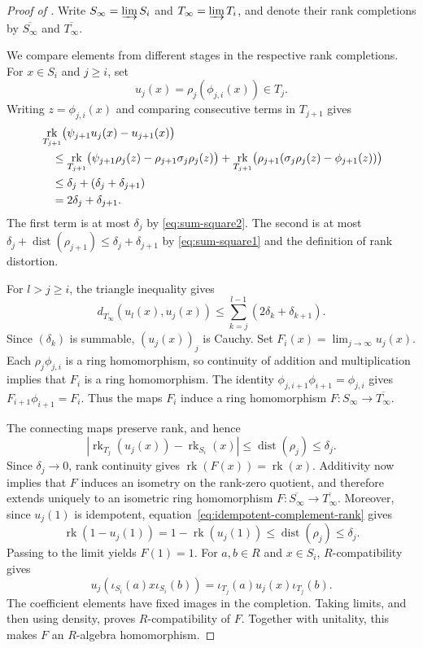 \documentclass[11pt]{amsart}
\DeclareMathOperator{\rk}{rk}
\theoremstyle{definition}
\theoremstyle{remark}
\begin{document}
\begin{proof}[Proof of ]
Write $S_\infty=\varinjlim S_i$ and $T_\infty=\varinjlim T_i$, and denote
their rank completions by $\overline{S_\infty}$ and $\overline{T_\infty}$.

We compare elements from different stages in the respective rank completions.
For $x\in S_i$ and $j\geq i$, set
\[
  u_j(x)=\rho_j(\phi_{j,i}(x))\in T_j.
\]
Writing $z=\phi_{j,i}(x)$ and comparing consecutive terms in $T_{j+1}$ gives
\begin{align}
 &\rk_{T_{j+1}}\bigl(\psi_{j+1}u_j(x)-u_{j+1}(x)\bigr)\notag\\*
 &\quad \leq
 \rk_{T_{j+1}}\bigl(\psi_{j+1}\rho_j(z)-\rho_{j+1}\sigma_j\rho_j(z)\bigr) +
 \rk_{T_{j+1}}\bigl(\rho_{j+1}(\sigma_j\rho_j(z)-\phi_{j+1}(z))\bigr)\notag\\
 &\quad \leq \delta_j+(\delta_j+\delta_{j+1})\notag\\
 &\quad =2\delta_j+\delta_{j+1}.
 \label{eq:F-consecutive}
\end{align}
The first term is at most $\delta_j$ by \eqref{eq:sum-square2}.
The second is at most
$\delta_j+\operatorname{dist}(\rho_{j+1})
\leq\delta_j+\delta_{j+1}$
by \eqref{eq:sum-square1} and the definition of rank distortion.

For $l>j\geq i$, the triangle inequality gives
\[
 d_{\overline{T_\infty}}(u_l(x),u_j(x))
 \leq\sum_{k=j}^{l-1}(2\delta_k+\delta_{k+1}).
\]
Since $(\delta_k)$ is summable, $(u_j(x))_j$ is Cauchy.  Set
$F_i(x)=\lim_{j\to\infty}u_j(x)$.
Each $\rho_j\phi_{j,i}$ is a ring homomorphism, so continuity of addition
and multiplication implies that $F_i$ is a ring homomorphism.
The identity $\phi_{j,i+1}\phi_{i+1}=\phi_{j,i}$ gives
$F_{i+1}\phi_{i+1}=F_i$.
Thus the maps $F_i$ induce a ring homomorphism
$F\colon S_\infty\to\overline{T_\infty}$.

The connecting maps preserve rank, and hence
\[
 \left|\rk_{T_j}(u_j(x))-\rk_{S_i}(x)\right|
 \leq\operatorname{dist}(\rho_j)\leq\delta_j.
\]
Since $\delta_j\to0$, rank continuity gives $\rk(F(x))=\rk(x)$.
Additivity now implies that $F$ induces an isometry on the rank-zero
quotient, and therefore extends uniquely to an isometric ring homomorphism
$F\colon\overline{S_\infty}\to\overline{T_\infty}$.
Moreover, since $u_j(1)$ is idempotent,
equation~\eqref{eq:idempotent-complement-rank} gives
\[
 \rk(1-u_j(1))=1-\rk(u_j(1))
 \leq\operatorname{dist}(\rho_j)\leq\delta_j.
\]
Passing to the limit yields $F(1)=1$.
For $a,b\in R$ and $x\in S_i$, $R$-compatibility gives
\[
 u_j(\iota_{S_i}(a)x\iota_{S_i}(b))
 =\iota_{T_j}(a)u_j(x)\iota_{T_j}(b).
\]
The coefficient elements have fixed images in the completion.
Taking limits, and then using density, proves $R$-compatibility of $F$.
Together with unitality, this makes $F$ an $R$-algebra homomorphism.


\end{proof}
\end{document}

